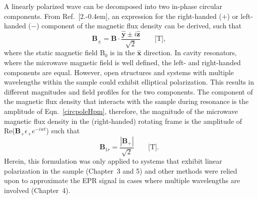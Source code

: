 A linearly polarized wave can be decomposed into two in-phase circular components. From Ref.~[2.\kern-0.4em], an expression for the right-handed ($+$) or left-handed ($-$) component of the magnetic flux density can be derived, such that
\begin{equation}
    \mathbf{B}_{\pm} =  \mathbf{B}\cdot\frac{\mathbf{\hat{y}} \pm i\mathbf{\hat{z}}}{\sqrt{2}} \qquad \text{[T]}, \label{circpoleHpm}
\end{equation}
where the static magnetic field B$_0$ is in the $\mathbf{\hat{x}}$ direction. In cavity resonators, where the microwave magnetic field is well defined, the left- and right-handed components are equal. However, open structures and systems with multiple wavelengths within the sample could exhibit elliptical polarization. This results in different magnitudes and field profiles for the two components. The component of the magnetic flux density that interacts with the sample during resonance is the amplitude of Eqn.~\ref{circpoleHpm}, therefore, the magnitude of the microwave magnetic flux density in the (right-handed) rotating frame is the amplitude of Re($\mathbf{B}_+\epsilon_+e^{-iwt}$) such that
\begin{equation}
    \mathbf{B}_{1r} =  \frac{|\mathbf{B}_{+}|}{\sqrt{2}} \qquad \text{[T]}. \label{circpoleH}
\end{equation}
Herein, this formulation was only applied to systems that exhibit linear polarization in the sample (Chapter~3 and 5) and other methods were relied upon to approximate the EPR signal in cases where multiple wavelengths are involved (Chapter~4).

